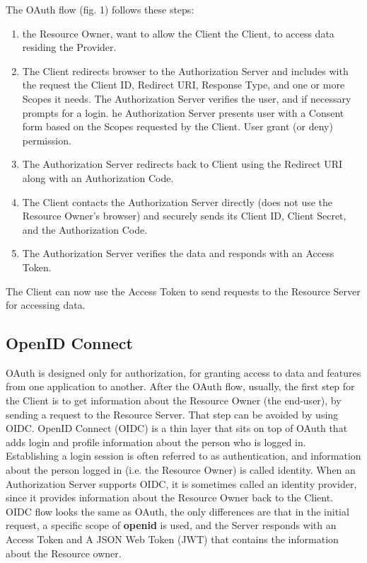 	The OAuth flow (fig. 1) follows these steps:
	\begin{enumerate}
		\item the Resource Owner, want to allow the Client the Client, to access data residing the Provider.
		
		\item The Client redirects browser to the Authorization Server and includes with the request the Client ID, Redirect URI, Response Type, and one or more Scopes it needs. The Authorization Server verifies the user, and if necessary prompts for a login. he Authorization Server presents user with a Consent form based on the Scopes requested by the Client. User grant (or deny) permission.
		
		\item The Authorization Server redirects back to Client using the Redirect URI along with an Authorization Code.
		
		\item The Client contacts the Authorization Server directly (does not use the Resource Owner’s browser) and securely sends its Client ID, Client Secret, and the Authorization Code.
		
		\item The Authorization Server verifies the data and responds with an Access Token.
		
	\end{enumerate}
The Client can now use the Access Token to send requests to the Resource Server for accessing data.



\subsection{OpenID Connect}

OAuth is designed only for authorization, for granting access to data and features from one application to another. After the OAuth flow, usually, the first step for the Client is to get information about the Resource Owner (the end-user), by sending a request to the Resource Server. That step can be avoided by using OIDC.
OpenID Connect (OIDC) is a thin layer that sits on top of OAuth that adds login and profile information about the person who is logged in. Establishing a login session is often referred to as authentication, and information about the person logged in (i.e. the Resource Owner) is called identity. When an Authorization Server supports OIDC, it is sometimes called an identity provider, since it provides information about the Resource Owner back to the Client. OIDC flow looks the same as OAuth, the only differences are that in the initial request, a specific scope of \textbf{openid} is used, and the Server responds with an Access Token and A JSON Web Token (JWT) that contains the information about the Resource owner.

